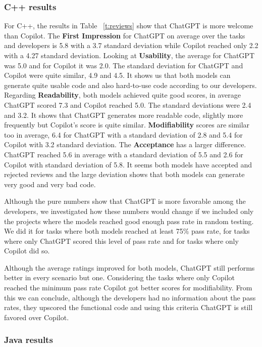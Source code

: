 \subsubsection{C++ results}
For C++, the results in Table ~\ref{t:reviews} show that ChatGPT is more welcome than Copilot.
The \textbf{First Impression} for ChatGPT on average over the tasks and developers is 5.8 with a 3.7 standard deviation while Copilot reached only 2.2 with a 4.27 standard deviation.
Looking at \textbf{Usability}, the average for ChatGPT was 5.0 and for Copilot it was 2.0.
The standard deviation for ChatGPT and Copilot were quite similar, 4.9 and 4.5.
It shows us that both models can generate quite usable code and also hard-to-use code according to our developers.
Regarding \textbf{Readability}, both models achieved quite good scores, in average ChatGPT scored 7.3 and Copilot reached 5.0.
The standard deviations were 2.4 and 3.2.
It shows that ChatGPT generates more readable code, slightly more frequently but Copilot's score is quite similar.
\textbf{Modifiability} scores are similar too in average, 6.4 for ChatGPT with a standard deviation of 2.8 and 5.4 for Copilot with 3.2 standard deviation.
The \textbf{Acceptance} has a larger difference.
ChatGPT reached 5.6 in average with a standard deviation of 5.5 and 2.6 for Copilot with standard deviation of 5.8.
It seems both models have accepted and rejected reviews and the large deviation shows that both models can generate very good and very bad code.

Although the pure numbers show that ChatGPT is more favorable among the developers, we investigated how these numbers would change if we included only the projects where the models reached good enough pass rate in random testing.
We did it for tasks where both models reached at least 75\% pass rate, for tasks where only ChatGPT scored this level of pass rate and for tasks where only Copilot did so.

Although the average ratings improved for both models, ChatGPT still performs better in every scenario but one.
Considering the tasks where only Copilot reached the minimum pass rate Copilot got better scores for modifiability.
From this we can conclude, although the developers had no information about the pass rates, they upscored the functional code and using this criteria ChatGPT is still favored over Copilot.

\subsubsection{Java results}

